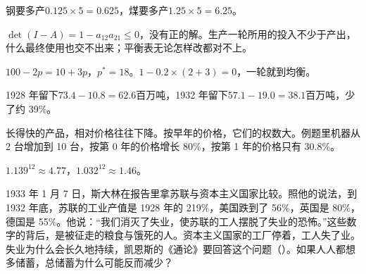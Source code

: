\begin{answers}
\item 钢要多产$0.125\times5=0.625$，煤要多产$1.25\times5=6.25$。
\item $\det(I-A)=1-a_{12}a_{21}\leq0$，没有正的解。生产一轮所用的投入不少于产出，什么最终使用也交不出来；平衡表无论怎样改都对不上。
\item $100-2p=10+3p$，$p^{*}=18$。$1-0.2\times(2+3)=0$，一轮就到均衡。
\item 1928 年留下$73.4-10.8=62.6$百万吨，1932 年留下$57.1-19.0=38.1$百万吨，少了约 39\%。
\item 长得快的产品，相对价格往往下降。按早年的价格，它们的权数大。例题里机器从 2 台增加到 10 台，按第 0 年的价格增长 80\%，按第 1 年的价格只有 30.8\%。
\item $1.139^{12}\approx4.77$，$1.032^{12}\approx1.46$。
\end{answers}

1933 年 1 月 7 日，斯大林在报告里拿苏联与资本主义国家比较。照他的说法，到 1932 年底，苏联的工业产值是 1928 年的 219\%，美国跌到了 56\%，英国是 80\%，德国是 55\%\cite{stalin1933}。他说：“我们消灭了失业，使苏联的工人摆脱了失业的恐怖。”\cite{stalin1933}这些数字的背后，是被征走的粮食与饿死的人。资本主义国家的工厂停着，工人失了业。失业为什么会长久地持续，凯恩斯的《通论》要回答这个问题（）。如果人人都想多储蓄，总储蓄为什么可能反而减少？

